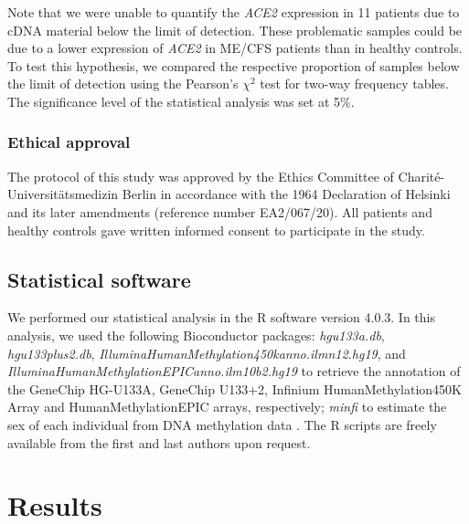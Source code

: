 Note that we were unable to quantify the \textit{ACE2} expression in 11 patients due to cDNA material below the limit of detection. These problematic samples could be due to a lower expression of \textit{ACE2} in ME/CFS patients than in healthy controls. To test this hypothesis, we compared the respective proportion of samples below the limit of detection using the Pearson's $\chi^2$ test for two-way frequency tables.
The significance level of the statistical analysis was set at 5\%.

\subsubsection{Ethical approval}

The protocol of this study was approved by the Ethics Committee of Charité-Universitätsmedizin Berlin in accordance with the 1964 Declaration of Helsinki and its later amendments (reference number EA2/067/20). All patients and healthy controls gave written informed consent to participate in the study.

\subsection{Statistical software}

We performed our statistical analysis in the R software version 4.0.3. In this analysis, we used the following Bioconductor packages: \textit{hgu133a.db}, \textit{hgu133plus2.db}, \textit{IlluminaHumanMethylation450kanno.ilmn12.hg19}, and \textit{IlluminaHumanMethylationEPICanno.ilm10b2.hg19} to retrieve the annotation of the GeneChip HG-U133A, GeneChip U133+2, Infinium HumanMethylation450K Array and HumanMethylationEPIC arrays, respectively; \textit{minfi} to estimate the sex of each individual from DNA methylation data \citep{aryee2014MinfiFlexible}. The R scripts are freely available from the first and last authors upon request.

\section{Results}

